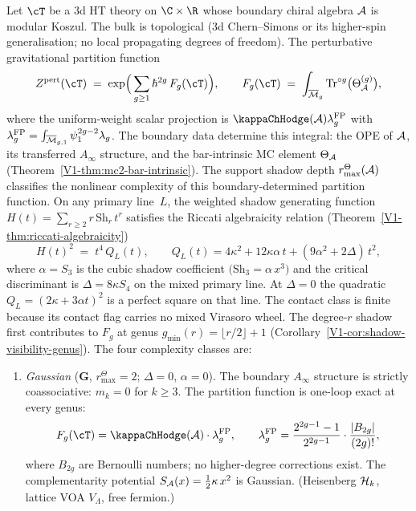 \begin{theorem}
\label{thm:thqg-boundary-holographic-complexity}
\ClaimStatusProvedHere
{}
Let $\cT$ be a $3$d HT theory on $\C \times \R$ whose boundary
chiral algebra $\mathcal{A}$ is modular Koszul.
The bulk is topological \textup{(}$3$d Chern--Simons or its
higher-spin generalisation; no local propagating degrees of
freedom\textup{)}. The perturbative gravitational partition
function
\begin{equation}\label{eq:boundary-holographic-Z}
 Z^{\mathrm{pert}}(\cT)
 \;=\;
 \exp\Bigl(\,\sum_{g \geq 1} \hbar^{2g}\,F_g(\cT)\Bigr),
 \qquad
 F_g(\cT)
 \;=\;
 \int_{\overline{\cM}_g}
 \operatorname{Tr}^{\circ g}\bigl(\Theta_\cA^{(g)}\bigr),
\end{equation}
where the uniform-weight scalar projection is
$\kappaChHodge(\cA)\lambda_g^{\mathrm{FP}}$ with
$\lambda_g^{\mathrm{FP}}
=\int_{\overline{\mathcal{M}}_{g,1}}\psi_1^{2g-2}\lambda_g$.
The boundary data determine this integral: the OPE of
$\mathcal{A}$, its transferred $A_\infty$ structure, and the
bar-intrinsic MC element $\Theta_{\mathcal{A}}$
\textup{(}Theorem~\textup{\ref*{V1-thm:mc2-bar-intrinsic}}\textup{)}.
The support shadow depth \(r^\Theta_{\max}(\mathcal{A})\) classifies the nonlinear
complexity of this boundary-determined partition function.
On any primary line~$L$, the weighted shadow generating function
$H(t) = \sum_{r \geq 2} r\,\mathrm{Sh}_r\,t^r$ satisfies
the Riccati algebraicity relation
\textup{(}Theorem~\textup{\ref*{V1-thm:riccati-algebraicity}}\textup{)}
\begin{equation}\label{eq:boundary-holographic-riccati}
 H(t)^2 \;=\; t^4\,Q_L(t),
 \qquad
 Q_L(t) = 4\kappa^2 + 12\kappa\alpha\,t
 + (9\alpha^2 + 2\Delta)\,t^2,
\end{equation}
where $\alpha = S_3$ is the cubic shadow coefficient
$\bigl(\mathrm{Sh}_3 = \alpha\,x^3\bigr)$ and the critical
discriminant is $\Delta = 8\kappa S_4$ on the mixed primary line.
At $\Delta = 0$ the quadratic
$Q_L = (2\kappa + 3\alpha t)^2$ is a perfect square on that line.
The contact class is finite because its contact flag carries no
mixed Virasoro wheel.
The degree-$r$ shadow first contributes to $F_g$ at genus
$g_{\min}(r) = \lfloor r/2 \rfloor + 1$
\textup{(}Corollary~\textup{\ref{V1-cor:shadow-visibility-genus}}\textup{)}.
The four complexity classes are:
\begin{enumerate}[label=\textup{(\roman*)}]
\item \emph{Gaussian} ($\mathbf{G}$, \(r^\Theta_{\max}=2\);
 $\Delta = 0$, $\alpha = 0$).
 The boundary $A_\infty$ structure is strictly
 coassociative: $m_k = 0$ for $k \geq 3$.
 The partition function is one-loop exact at every genus:
 \[
 F_g(\cT) = \kappaChHodge(\cA)\cdot\lambda_g^{\mathrm{FP}},
 \qquad
 \lambda_g^{\mathrm{FP}} =
 \frac{2^{2g-1}-1}{2^{2g-1}}\cdot
 \frac{|B_{2g}|}{(2g)!},
 \]
 where $B_{2g}$ are Bernoulli numbers; no higher-degree
 corrections exist. The complementarity potential
 $S_{\mathcal{A}}(x) = \tfrac{1}{2}\kappa\,x^2$ is Gaussian.
 \textup{(}Heisenberg $\mathcal{H}_k$, lattice VOA $V_\Lambda$,
 free fermion.\textup{)}


\end{enumerate}
\end{theorem}
